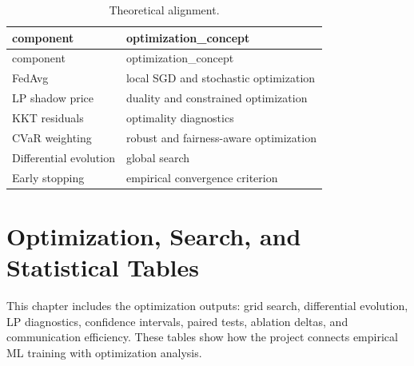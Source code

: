 \documentclass[11pt]{report}
\begin{document}
\begin{longtable}{ll}
\caption{Theoretical alignment.}\\
\toprule
component & optimization\_concept \\
\midrule
\endfirsthead
\toprule
component & optimization\_concept \\
\midrule
\endhead
FedAvg & local SGD and stochastic optimization \\
LP shadow price & duality and constrained optimization \\
KKT residuals & optimality diagnostics \\
CVaR weighting & robust and fairness-aware optimization \\
Differential evolution & global search \\
Early stopping & empirical convergence criterion \\
\bottomrule
\end{longtable}
\chapter{Optimization, Search, and Statistical Tables}
This chapter includes the optimization outputs: grid search, differential evolution, LP diagnostics,
confidence intervals, paired tests, ablation deltas, and communication efficiency. These tables show
how the project connects empirical ML training with optimization analysis.
\end{document}
